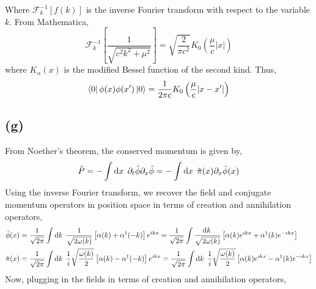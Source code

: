 \documentclass[12pt]{extarticle}
\begin{document}
Where $\mathcal{F}_k^{-1}[f(k)]$ is the inverse Fourier transform with respect to the variable $k$.
From Mathematica,  
\[ \mathcal{F}_k^{-1} \left[ \frac{1}{\sqrt{c^2 k^2 + \mu^2}} \right] = \sqrt{\frac{2}{\pi c^2}} K_0\left( \frac{\mu}{c} |x| \right) \]
where $K_\alpha(x)$ is the modified Bessel function of the second kind. Thus,
\[ \left< 0 \right| \phi(x) \phi(x') \left| 0 \right> = \frac{1}{2 \pi c} K_0 \left( \frac{\mu}{c} |x - x'| \right) \]
\subsection*{(g)}
From Noether's theorem, the conserved momentum is given by,
\[ \hat{P} = - \int \mathrm{d}x \: \: \partial_t \hat{\phi} \partial_x \hat{\phi} = - \int \mathrm{d}x \: \: \hat{\pi}(x) \partial_x \hat{\phi}(x) \] 
Using the inverse Fourier transform, we recover the field and conjugate momentum operators in position space in terms of creation and annihilation operators,
\begin{align*} 
\hat{\phi}(x) & = \frac{1}{\sqrt{2\pi}} \int \mathrm{d}k \: \: \frac{1}{\sqrt{2 \omega(k)}} \left[ \alpha(k) + \alpha^\dagger(-k) \right] e^{i k x}  = \frac{1}{\sqrt{2\pi}} \int \frac{\mathrm{d}k \:}{\sqrt{2 \omega(k)}} \left[ \alpha(k) e^{i k x} + \alpha^\dagger(k) e^{- i k x} \right] \\
\hat{\pi}(x) & = \frac{1}{\sqrt{2\pi}} \int \mathrm{d}k \: \: \frac{1}{i} \sqrt{\frac{\omega(k)}{2}} \left[ \alpha(k) - \alpha^\dagger(-k) \right] e^{i k x} = \frac{1}{\sqrt{2\pi}} \int \mathrm{d}k \: \: \frac{1}{i} \sqrt{\frac{\omega(k)}{2}} \left[ \alpha(k) e^{i k x} - \alpha^\dagger(k) e^{- i k x} \right]
\end{align*}
Now, plugging in the fields in terms of creation and annihilation operators, 
\end{document}

